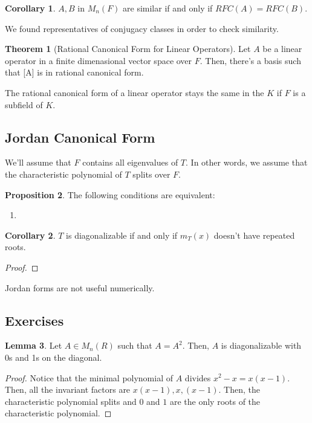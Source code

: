 \documentclass{article}
\theoremstyle{definition}
\newtheorem{theorem}{Theorem}[section]
\newtheorem{lemma}[theorem]{Lemma}
\newtheorem{corollary}{Corollary}[theorem]
\newtheorem{proposition}[theorem]{Proposition}
\begin{document}
\begin{corollary}
    $A,B$ in $M_{n}(F)$ are similar if and only if $RFC(A) = RFC(B)$.
\end{corollary}

We found representatives of conjugacy classes in order to check similarity.

\begin{theorem}[Rational Canonical Form for Linear Operators]
    Let $A$ be a linear operator in a finite dimenasional vector space
    over $F$. Then, there's a basis such that [A] is in rational canonical
    form.
\end{theorem}

The rational canonical form of a linear operator stays the same in the $K$ if $F$ is
a subfield of $K$.

\subsection{Jordan Canonical Form}

We'll assume that $F$ contains all eigenvalues of $T$. In other words, we assume that the characteristic
polynomial of $T$ splits over $F$.

\begin{proposition}
    The following conditions are equivalent:

    \begin{enumerate}
        \item 
    \end{enumerate}
\end{proposition}

\begin{corollary}
    $T$ is diagonalizable if and only if $m_{T}(x)$ doesn't have repeated roots.
\end{corollary}
\begin{proof}
    
\end{proof}

Jordan forms are not useful numerically.

\newpage

\subsection{Exercises}

\begin{lemma}
    Let $A \in M_{n}(R)$ such that $A = A^{2}$. Then, $A$ is diagonalizable
    with 0s and 1s on the diagonal.
\end{lemma}
\begin{proof}
    Notice that the minimal polynomial of $A$ divides $x^{2} - x = x (x-1)$. Then,
    all the invariant factors are $x(x-1), x, (x-1)$. Then, the characteristic
    polynomial splits and $0$ and $1$ are the only roots of the characteristic polynomial.
\end{proof}
\end{document}
